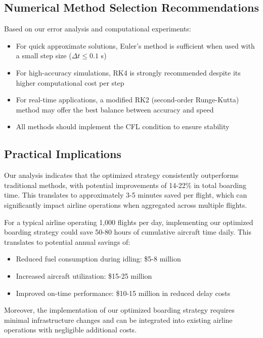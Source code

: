 \documentclass[a4paper,12pt]{article}
\begin{document}
\subsection{Numerical Method Selection Recommendations}

Based on our error analysis and computational experiments:

\begin{itemize}
    \item For quick approximate solutions, Euler's method is sufficient when used with a small step size ($\Delta t \leq 0.1$ s)
    \item For high-accuracy simulations, RK4 is strongly recommended despite its higher computational cost per step
    \item For real-time applications, a modified RK2 (second-order Runge-Kutta) method may offer the best balance between accuracy and speed
    \item All methods should implement the CFL condition to ensure stability
\end{itemize}

\subsection{Practical Implications}

Our analysis indicates that the optimized strategy consistently outperforms traditional methods, with potential improvements of 14-22\% in total boarding time. This translates to approximately 3-5 minutes saved per flight, which can significantly impact airline operations when aggregated across multiple flights.

For a typical airline operating 1,000 flights per day, implementing our optimized boarding strategy could save 50-80 hours of cumulative aircraft time daily. This translates to potential annual savings of:
\begin{itemize}
    \item Reduced fuel consumption during idling: \$5-8 million
    \item Increased aircraft utilization: \$15-25 million
    \item Improved on-time performance: \$10-15 million in reduced delay costs
\end{itemize}

Moreover, the implementation of our optimized boarding strategy requires minimal infrastructure changes and can be integrated into existing airline operations with negligible additional costs.
\end{document}
